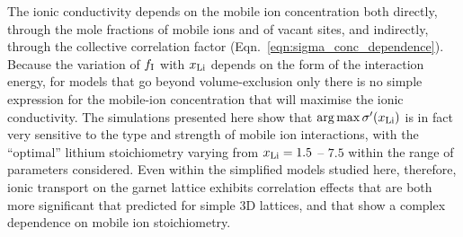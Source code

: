 \documentclass[aps,prb,twocolumn,superscriptaddress,reprint]{revtex4-1}
\newcommand{\xLi}{x_\m{Li}}
\begin{document}
The ionic conductivity depends on the mobile ion concentration both directly, through the mole fractions of mobile ions and of vacant sites, and indirectly, through the collective correlation factor (Eqn.~\ref{eqn:sigma_conc_dependence}). Because the variation of $f_{\mathrm{I}}$ with $\xLi$ depends on the form of the interaction energy, for models that go beyond volume-exclusion only there is no simple expression for the mobile-ion concentration that will maximise the ionic conductivity. The simulations presented here show that $\arg \max \sigma^\prime(\xLi)$ is in fact very sensitive to the type and strength of mobile ion interactions, with the ``optimal'' lithium stoichiometry varying from $\xLi=1.5$ -- $7.5$ within the range of parameters considered. Even within the simplified models studied here, therefore, ionic transport on the garnet lattice exhibits correlation effects that are both more significant that predicted for simple 3D lattices, and that show a complex dependence on mobile ion stoichiometry.
\end{document}
